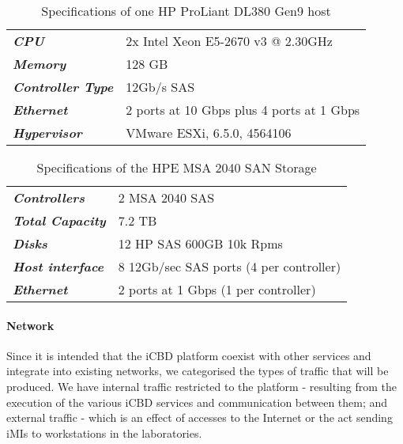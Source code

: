\begin{table}[htpb]
\centering
\begin{tabular}{ll}
\textit{\textbf{CPU}}             & 2x Intel Xeon E5-2670 v3 @ 2.30GHz        \\
\textit{\textbf{Memory}}          & 128 GB                                    \\
\textit{\textbf{Controller Type}} & 12Gb/s SAS                                \\
\textit{\textbf{Ethernet}}        & 2 ports at 10 Gbps plus 4 ports at 1 Gbps \\
\textit{\textbf{Hypervisor}}      & VMware ESXi, 6.5.0, 4564106              
\end{tabular}
\caption{Specifications of one HP ProLiant DL380 Gen9 host}
\label{tab:imple_hp}
\end{table}

\newpage

\begin{table}[htpb]
\centering
\begin{tabular}{ll}
\textit{\textbf{Controllers}}    & 2 MSA 2040 SAS                          \\
\textit{\textbf{Total Capacity}} & 7.2 TB                                  \\
\textit{\textbf{Disks}}          & 12 HP SAS 600GB 10k Rpms                \\
\textit{\textbf{Host interface}} & 8 12Gb/sec SAS ports (4 per controller) \\
\textit{\textbf{Ethernet}}       & 2 ports at 1 Gbps (1 per controller)   
\end{tabular}
\caption{Specifications of the HPE MSA 2040 SAN Storage}
\label{tab:imple_msa}
\end{table}


\paragraph{Network}
\label{par:impl_infra_network}

Since it is intended that the iCBD platform coexist with other services and integrate into existing networks, we categorised the types of traffic that will be produced. We have internal traffic restricted to the platform - resulting from the execution of the various iCBD services and communication between them; and external traffic - which is an effect of accesses to the Internet or the act sending iMIs to workstations in the laboratories.

